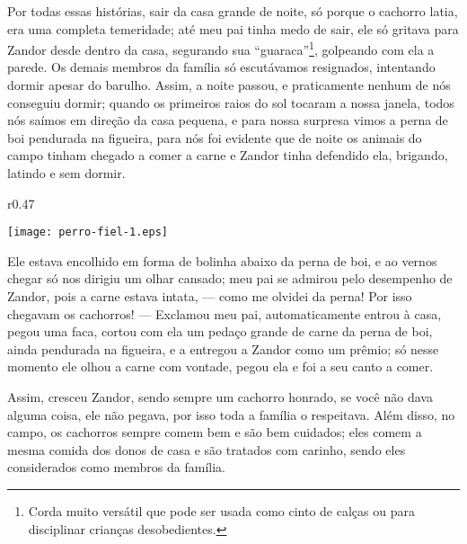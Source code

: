 Por todas essas histórias, sair da casa grande de noite, só porque o cachorro latia, era uma completa temeridade; até meu pai tinha medo de sair, ele só gritava para Zandor desde dentro da casa, segurando sua ``guaraca''\footnote{Corda muito versátil que pode ser usada como cinto de calças ou para disciplinar crianças desobedientes.}, golpeando com ela a parede. 
Os demais membros da família só escutávamos resignados, intentando dormir apesar do barulho.
Assim, a noite passou, e praticamente nenhum de nós conseguiu dormir; quando os primeiros raios do sol tocaram a nossa janela, todos nós saímos em direção da casa pequena, e para nossa surpresa vimos a perna de boi pendurada na figueira, para nós foi evidente que de noite os animais do campo tinham chegado a comer a carne e Zandor tinha defendido ela, brigando, latindo e sem dormir. 
\begin{wrapfigure}{r}{0.47\textwidth}
  \begin{center}
  \vspace{-0.5cm}
    \texttt{[image: perro-fiel-1.eps]}
  \end{center}
  \vspace{-0.5cm}
\end{wrapfigure}
Ele estava encolhido em forma de bolinha abaixo da perna de boi, e ao vernos chegar só nos dirigiu um olhar cansado; meu pai se admirou pelo desempenho de Zandor, pois a carne estava intata, --- como me olvidei da perna! Por isso chegavam os cachorros! --- 
Exclamou meu pai, automaticamente entrou à casa, pegou uma faca, cortou com ela um pedaço grande de carne da perna de boi, ainda pendurada na figueira, e a entregou a Zandor como um prêmio; só nesse momento ele olhou a carne com vontade, pegou ela e foi a seu canto a comer.

Assim, cresceu Zandor, sendo sempre um cachorro honrado, se você não dava alguma coisa, ele não pegava, por isso toda a família o respeitava. Além disso, no campo, os cachorros sempre comem bem e são bem cuidados; eles comem a mesma comida dos donos de casa e são tratados com carinho, sendo eles considerados como membros da família.

